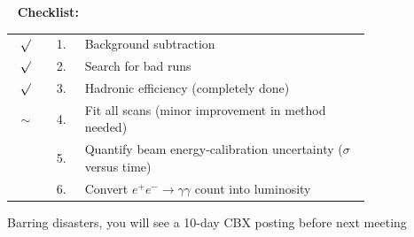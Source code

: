 \documentclass[landscape]{article}
\newenvironment{slide}{\mbox{ }\vfill}{\vfill \mbox{ } \pagebreak}
\begin{document}
\begin{slide}
{\bf Checklist:}

\vfill
\renewcommand{\arraystretch}{2}
\begin{center}
  \begin{tabular}{c c p{0.8\linewidth}}
    $\surd$ & 1. & Background subtraction \\
    $\surd$ & 2. & Search for bad runs \\
    $\surd$ & 3. & Hadronic efficiency (completely done) \\
    $\sim$ & 4. & Fit all scans (minor improvement in method needed) \\
    & 5. & Quantify beam energy-calibration uncertainty ($\sigma$ versus time) \\
    & 6. & Convert $e^+e^- \to \gamma\gamma$ count into luminosity \\
  \end{tabular}
\end{center}

\vfill
Barring disasters, you will see a 10-day CBX posting before next meeting

\end{slide}
\end{document}
